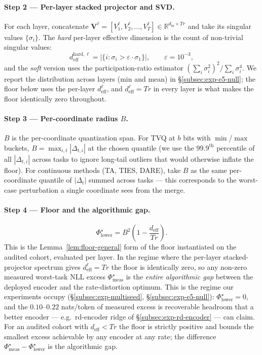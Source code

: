 \paragraph{Step 2 --- Per-layer stacked projector and SVD.}
For each layer, concatenate
$\mathbf{V}^\ell = [V_1^\ell, V_2^\ell, \dots, V_T^\ell] \in
\mathbb{R}^{d_{\mathrm{in}} \times Tr}$ and take its singular values
$\{\sigma_i\}$. The \emph{hard} per-layer effective dimension is the
count of non-trivial singular values:
\begin{equation*}
  d_{\mathrm{eff}}^{\mathrm{hard}, \ell}
  = \big| \{i : \sigma_i > \varepsilon \cdot \sigma_1\} \big|,
  \qquad \varepsilon = 10^{-3},
\end{equation*}
and the \emph{soft} version uses the participation-ratio
estimator $(\sum_i \sigma_i^2)^2 / \sum_i \sigma_i^4$. We report the
distribution across layers (min and mean) in
\S\ref{subsec:exp-e5-null}; the floor below uses the per-layer
$d_{\mathrm{eff}}^\ell$, and $d_{\mathrm{eff}}^\ell = Tr$ in every
layer is what makes the floor identically zero throughout.

\paragraph{Step 3 --- Per-coordinate radius $B$.}
$B$ is the per-coordinate quantization span. For TVQ at $b$ bits with
$\min$/$\max$ buckets, $B = \max_{i, t} |\Delta_{t,i}|$ at the chosen
quantile (we use the $99.9^{\mathrm{th}}$ percentile of all
$|\Delta_{t,i}|$ across tasks to ignore long-tail outliers that would
otherwise inflate the floor). For continuous methods (TA, TIES, DARE),
take $B$ as the same per-coordinate quantile of $|\Delta_t|$ summed
across tasks --- this corresponds to the worst-case perturbation a
single coordinate sees from the merge.

\paragraph{Step 4 --- Floor and the algorithmic gap.}
\begin{equation*}
  \Phi^\star_{\mathrm{lower}}
  = B^2 \left(1 - \frac{d_{\mathrm{eff}}}{T r}\right).
\end{equation*}
This is the Lemma~\ref{lem:floor-general} form of the floor instantiated
on the audited cohort, evaluated per layer. In the regime where the
per-layer stacked-projector
spectrum gives $d_{\mathrm{eff}}^\ell = Tr$ the floor is identically zero,
so any non-zero measured worst-task NLL excess
$\Phi^\star_{\mathrm{meas}}$ is the \emph{entire algorithmic gap}
between the deployed encoder and the rate-distortion optimum. This is
the regime our experiments occupy
(\S\ref{subsec:exp-multiseed}, \S\ref{subsec:exp-e5-null}):
$\Phi^\star_{\mathrm{lower}} = 0$, and the $0.10$--$0.22$ nats/token
of measured excess is recoverable headroom that a better encoder ---
e.g.\ rd-encoder ridge of \S\ref{subsec:exp-rd-encoder} --- can claim.
For an audited cohort with $d_{\mathrm{eff}} < Tr$ the floor is
strictly positive and bounds the smallest excess achievable by any
encoder at any rate; the difference
$\Phi^\star_{\mathrm{meas}} - \Phi^\star_{\mathrm{lower}}$ is the
algorithmic gap.

